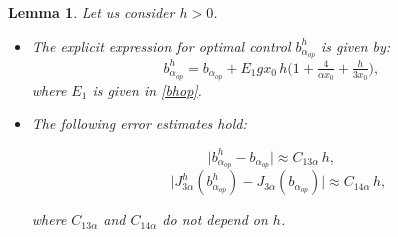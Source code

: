 \documentclass[11pt]{article}
\newtheorem{Lemma}{Lemma}
\begin{document}
\begin{Lemma} Let us consider $h > 0$.
    
     \begin{itemize}
      \item[(a)]  The explicit expression for optimal control ${b^h_{\alpha_{op}}} $ is given by:     
     \begin{equation}\label{bhalphaop}
      {b^h_{\alpha_{op}}} =b_{\alpha_{op}} + E_1 g x_0 \,h \Big(1+\tfrac{4}{\alpha x_0}+ \tfrac{h}{3 x_0}\Big),
     \end{equation}
     where $E_1$ is given in \eqref{bhop}.
     \noindent 
     
      \item[(b)] The following error estimates hold:
  
     		\begin{equation}\label{bhalphaop-balphaop}  
     				      \lvert {b^h_{\alpha_{op}}} - b_{\alpha_{op}} \rvert \approx C_{13\alpha} \, h ,
     				      \end{equation}\label{J3halphabhalphaop-J3alphabalphaop}
     				      \begin{equation}     		\quad 		     \Big \lvert { J^h_{3\alpha}}({b^h_{\alpha_{op}}}) -  J_{3\alpha}(b_{\alpha_{op}}) \Big \rvert \approx C_{14\alpha} \, h,
     				      \end{equation}
    		
        where $C_{13\alpha}$  and $C_{14\alpha}$ do not depend on $h$.
     
     \end{itemize}
    
  \end{Lemma}
\end{document}
